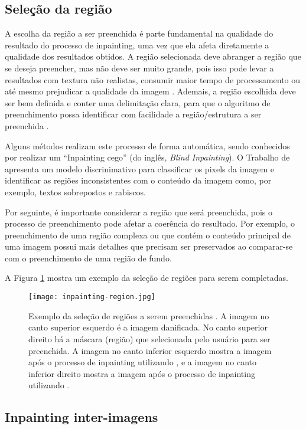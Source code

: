\subsection{Seleção da região} 
A escolha da região a ser preenchida é parte fundamental na qualidade do resultado do processo de inpainting, uma vez que ela afeta diretamente a qualidade dos resultados obtidos. A região selecionada deve abranger a região que se deseja preencher, mas não deve ser muito grande, pois isso pode levar a resultados com textura não realistas, consumir maior tempo de processamento ou até mesmo prejudicar a qualidade da imagem \cite{wang2020vcnet}.
Ademais, a região escolhida deve ser bem definida e conter uma delimitação clara, para que o algoritmo de preenchimento possa identificar com facilidade a região/estrutura a ser preenchida \cite{huang2014image}.

Alguns métodos realizam este processo de forma automática, sendo conhecidos por realizar um ``Inpainting cego'' (do inglês, \emph{Blind Inpainting}). O Trabalho de \cite{wang2020vcnet} apresenta um modelo discrinimativo para classificar os pixels da imagem e identificar as regiões inconsistentes com o conteúdo da imagem como, por exemplo, textos sobrepostos e rabiscos.

Por seguinte, é importante considerar a região que será preenchida, pois o processo de preenchimento pode afetar a coerência do resultado. Por exemplo, o preenchimento de uma região complexa ou que contém o conteúdo principal de uma imagem possui mais detalhes que precisam ser preservados ao comparar-se com o preenchimento de uma região de fundo.

A Figura \ref{fig:inpainting-region} mostra um exemplo da seleção de regiões para serem completadas.
\begin{figure}[ht]
\centering
\texttt{[image: inpainting-region.jpg]}
\caption{Exemplo da seleção de regiões a serem preenchidas \cite{OpenCVmessi}. A imagem no canto superior esquerdo é a imagem danificada. No canto superior direito há a máscara (região) que selecionada pelo usuário para ser preenchida. A imagem no canto inferior esquerdo mostra a imagem após o processo de inpainting utilizando \cite{Bertalmio2001navier}, e a imagem no canto inferior direito mostra a imagem após o processo de inpainting utilizando \cite{Telea2004}.}
\label{fig:inpainting-region}
\end{figure}

\subsection{Inpainting inter-imagens} \label{inpainting-intra}

